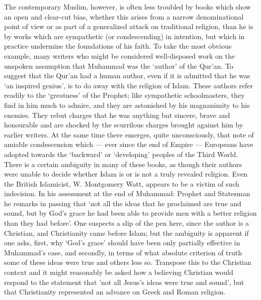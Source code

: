\documentclass[10pt, twoside,openright]{book}
\begin{document}
The contemporary Muslim, however, is often less troubled by books which show an open and clear\hyp{}cut bias, whether this arises from a narrow denominational point of view or as part of a generalized attack on traditional religion, than he is by works which are sympathetic (or condescending) in intention, but which in practice undermine the foundations of his faith. To take the most obvious example, many writers who might be considered well\hyp{}disposed work on the unspoken assumption that Muhammad was the `author' of the Qur'an. To suggest that the Qur'an had a human author, even if it is admitted that he was `an inspired genius', is to do away with the religion of Islam. These authors refer readily to the `greatness' of the Prophet; like sympathetic schoolmasters, they find in him much to admire, and they are astonished by his magnanimity to his enemies. They rebut charges that he was anything but sincere, brave and honourable and are shocked by the scurrilous charges brought against him by earlier writers. At the same time there emerges, quite unconsciously, that note of amiable condescension which --- ever since the end of Empire --- Europeans have adopted towards the `backward' or `developing' peoples of the Third World. \\

There is a certain ambiguity in many of these books, as though their authors were unable to decide whether Islam is or is not a truly revealed religion. Even the British Islamicist, W. Montgomery Watt, appears to be a victim of such indecision. In his assessment at the end of Muhammad: Prophet and Statesman he remarks in passing that `not all the ideas that he proclaimed are true and sound, but by God's grace he had been able to provide men with a better religion than they had before'. One suspects a slip of the pen here, since the author is a Christian, and Christianity came before Islam; but the ambiguity is apparent if one asks, first, why `God's grace' should have been only partially effective in Muhammad's case, and secondly, in terms of what absolute criterion of truth some of these ideas were true and others less so. Transpose this to the Christian context and it might reasonably be asked how a believing Christian would respond to the statement that 'not all Jesus's ideas were true and sound', but that Christianity represented an advance on Greek and Roman religion. \\
\end{document}
